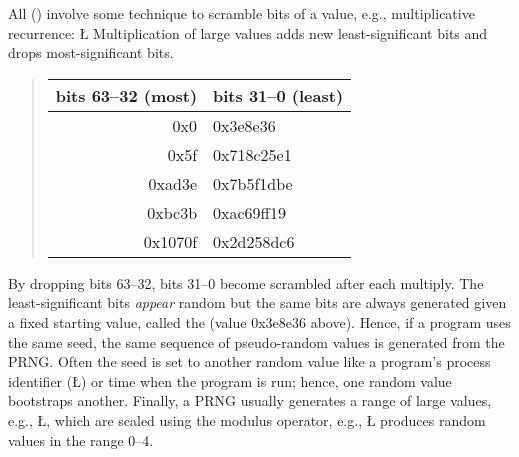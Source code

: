 \documentclass[openright,twoside]{report}
\begin{document}
All  () involve some technique to scramble bits of a value, e.g., multiplicative recurrence:
\LGinlinefalse\LGbegin\lgrinde
\L{}
\CE{}\endlgrinde\LGend
Multiplication of large values adds new least-significant bits and drops most-significant bits.
\begin{quote}
\begin{tabular}{@{}r|l@{}}
bits 63--32 (most)	& bits 31--0 (least)	\\
\hline
0x0					& 0x3e8e36				\\
0x5f				& 0x718c25e1			\\
0xad3e				& 0x7b5f1dbe			\\
0xbc3b				& 0xac69ff19			\\
0x1070f				& 0x2d258dc6			\\
\end{tabular}
\end{quote}
By dropping bits 63--32, bits 31--0 become scrambled after each multiply.
The least-significant bits \emph{appear} random but the same bits are always generated given a fixed starting value, called the  (value 0x3e8e36 above).
Hence, if a program uses the same seed, the same sequence of pseudo-random values is generated from the PRNG.
Often the seed is set to another random value like a program's process identifier (\LGinlinetrue\LGbegin\lgrinde\L{}\endlgrinde\LGend{}) or time when the program is run;
hence, one random value bootstraps another.
Finally, a PRNG usually generates a range of large values, e.g., \LGinlinetrue\LGbegin\lgrinde\L{}\endlgrinde\LGend{}, which are scaled using the modulus operator, e.g., \LGinlinetrue\LGbegin\lgrinde\L{}\endlgrinde\LGend{} produces random values in the range 0--4.
\end{document}
